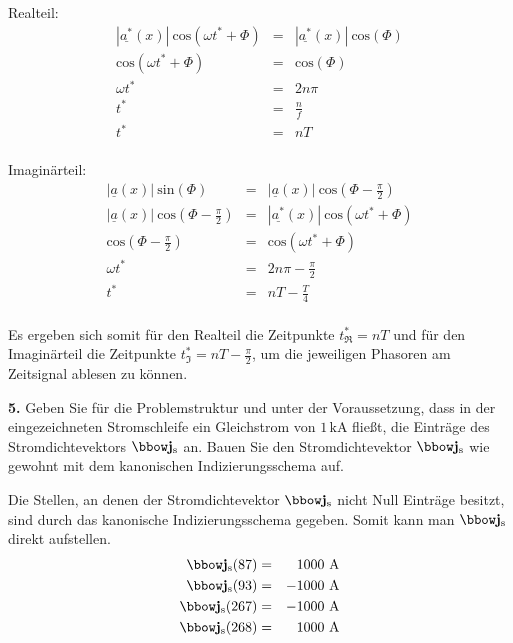 \documentclass[Protokollheft.tex]{subfiles}
\begin{document}
Realteil:
\begin{eqnarray*}
|\underline{a^*}(x)|\ \text{cos}(\omega t^*+\Phi)&=&|\underline{a^*}(x)|\ \text{cos}(\Phi)\\
\text{cos}(\omega t^*+\Phi)&=&\text{cos}(\Phi)\\
\omega t^*&=&2n\pi\\
t^*&=&\frac{n}{f}\\
t^*&=&nT
\end{eqnarray*}
\\
Imaginärteil:
\begin{eqnarray*}
|\underline{a}(x)|\ \text{sin}(\Phi)&=&|\underline{a}(x)|\ \text{cos}(\Phi-\frac{\pi}{2})\\
|\underline{a}(x)|\ \text{cos}(\Phi-\frac{\pi}{2})&=&|\underline{a^*}(x)|\ \text{cos}(\omega t^*+\Phi)\\
\text{cos}(\Phi-\frac{\pi}{2})&=&\text{cos}(\omega t^*+\Phi)\\
\omega t^*&=&2n\pi-\frac{\pi}{2}\\
t^*&=&nT-\frac{T}{4}
\end{eqnarray*}
\\
Es ergeben sich somit für den Realteil die Zeitpunkte $t^*_{\Re}=nT$ und für den Imaginärteil die Zeitpunkte $t^*_{\Im}=nT-\frac{\pi}{2}$, um die jeweiligen Phasoren am Zeitsignal ablesen zu können.

\begin{framed}
	\noindent \textbf{5.} Geben Sie für die Problemstruktur und unter der Voraussetzung, dass in der eingezeichneten Stromschleife ein Gleichstrom von $1\,\text{kA}$
      fließt, die Einträge des Stromdichtevektors $\jfit_\text{s}$ an. Bauen Sie den Stromdichtevektor $\jfit_\text{s}$ wie gewohnt mit dem kanonischen Indizierungsschema auf.\label{exer:calcCurrentExcitation}
\end{framed}
\noindent
Die Stellen, an denen der Stromdichtevektor $\jfit_\text{s}$ nicht Null Einträge besitzt, sind durch das kanonische Indizierungsschema gegeben. Somit kann man $\jfit_\text{s}$ direkt aufstellen.
\begin{eqnarray*}
	\jfit_\text{s}(87)&=&1000\ \text{A}\\
	\jfit_\text{s}(93)&=&-1000\ \text{A}\\
	\jfit_\text{s}(267)&=&-1000\ \text{A}\\
	\jfit_\text{s}(268)&=&1000\ \text{A}\\
\end{eqnarray*}
\end{document}

